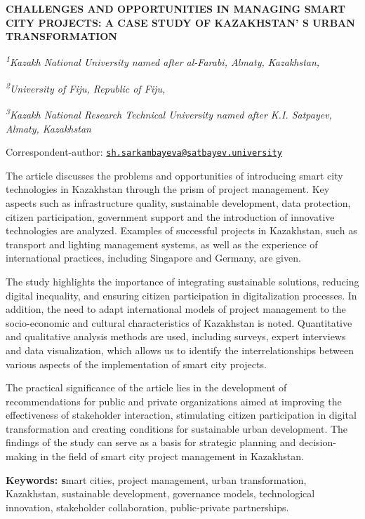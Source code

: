 
{\bfseries CHALLENGES AND OPPORTUNITIES IN MANAGING SMART CITY PROJECTS: A
CASE STUDY OF KAZAKHSTAN' S URBAN TRANSFORMATION}


\emph{\textsuperscript{1}Kazakh National University named after
al-Farabi, Almaty, Kazakhstan,}

\emph{\textsuperscript{2}University of Fiju, Republic of Fiju,}

\emph{\textsuperscript{3}Kazakh National Research Technical University
named after K.I. Satpayev, Almaty, Kazakhstan}

{\bfseries \textsuperscript{\envelope }}Correspondent-author:
\href{mailto:sh.sarkambayeva@satbayev.university}{\nolinkurl{sh.sarkambayeva@satbayev.university}}

The article discusses the problems and opportunities of introducing
smart city technologies in Kazakhstan through the prism of project
management. Key aspects such as infrastructure quality, sustainable
development, data protection, citizen participation, government support
and the introduction of innovative technologies are analyzed. Examples
of successful projects in Kazakhstan, such as transport and lighting
management systems, as well as the experience of international
practices, including Singapore and Germany, are given.

The study highlights the importance of integrating sustainable
solutions, reducing digital inequality, and ensuring citizen
participation in digitalization processes. In addition, the need to
adapt international models of project management to the socio-economic
and cultural characteristics of Kazakhstan is noted. Quantitative and
qualitative analysis methods are used, including surveys, expert
interviews and data visualization, which allows us to identify the
interrelationships between various aspects of the implementation of
smart city projects.

The practical significance of the article lies in the development of
recommendations for public and private organizations aimed at improving
the effectiveness of stakeholder interaction, stimulating citizen
participation in digital transformation and creating conditions for
sustainable urban development. The findings of the study can serve as a
basis for strategic planning and decision-making in the field of smart
city project management in Kazakhstan.

{\bfseries Keywords: s}mart cities, project management, urban
transformation, Kazakhstan, sustainable development, governance models,
technological innovation, stakeholder collaboration, public-private
partnerships.

